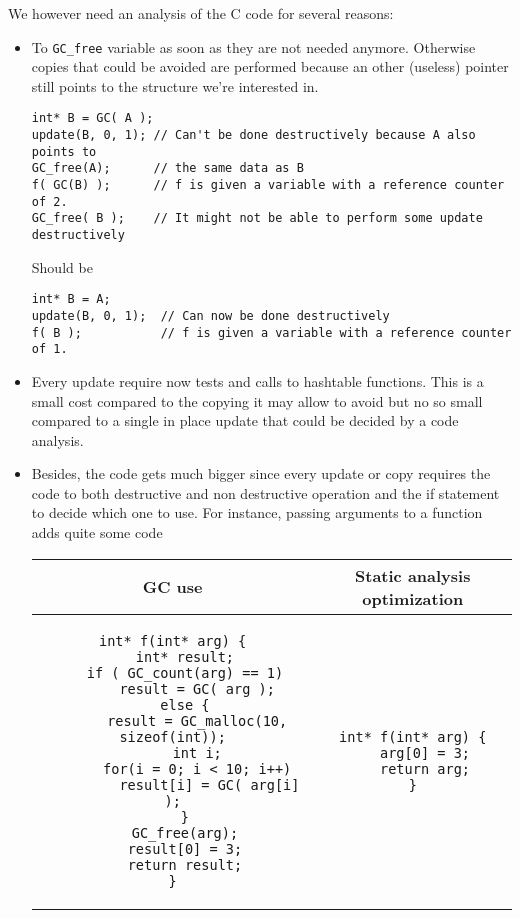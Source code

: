 \documentclass[12pt,a4paper]{article}
\newcommand{\cl}[1]{\texttt{#1}}
\begin{document}
We however need an analysis of the C code for several reasons:
\begin{itemize}
\item To \cl{GC\_free} variable as soon as they are not needed anymore. Otherwise copies that could be avoided are performed because an other (useless) pointer still points to the structure we're interested in.
\begin{lstlisting}
int* B = GC( A );
update(B, 0, 1); // Can't be done destructively because A also points to
GC_free(A);      // the same data as B
f( GC(B) );      // f is given a variable with a reference counter of 2.
GC_free( B );    // It might not be able to perform some update destructively
\end{lstlisting}
Should be
\begin{lstlisting}
int* B = A;
update(B, 0, 1);  // Can now be done destructively
f( B );           // f is given a variable with a reference counter of 1.
\end{lstlisting}
\item Every update require now tests and calls to hashtable functions. This is a small cost compared to the copying it may allow to avoid but no so small compared to a single in place update that could be decided by a code analysis.
\item Besides, the code gets much bigger since every update or copy requires the code to both destructive and non destructive operation and the if statement to decide which one to use. For instance, passing arguments to a function adds quite some code
\begin{center}
\begin{tabular}{|c||c|}
\hline
GC use & Static analysis optimization \\ \hline
\begin{lstlisting}
int* f(int* arg) {
   int* result;
   if ( GC_count(arg) == 1)
      result = GC( arg );
   else {
      result = GC_malloc(10, sizeof(int));
      int i;
      for(i = 0; i < 10; i++)
         result[i] = GC( arg[i] );
   }
   GC_free(arg);
   result[0] = 3;
   return result;
}
\end{lstlisting}
&
\begin{lstlisting}
int* f(int* arg) {
   arg[0] = 3;
   return arg;
}
\end{lstlisting} \\ \hline
\end{tabular}
\end{center}

\end{itemize}
\end{document}
